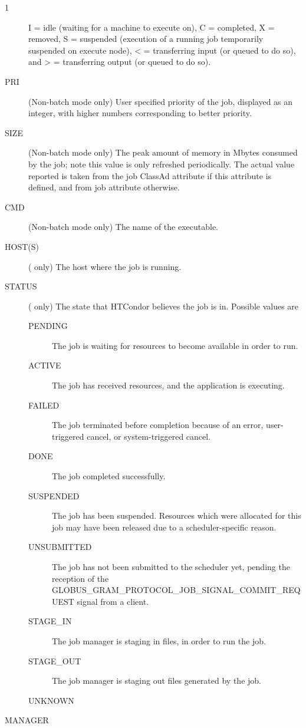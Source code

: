 \begin{ManPage}{\label{man-condor-q}}{1}
\begin{description}
	I = idle
        (waiting for a machine to execute on), C = completed, 
        X = removed,
		S = suspended (execution of a running job temporarily suspended on execute node),
        < = transferring input (or queued to do so), and
        > = transferring output (or queued to do so). 
\item[PRI] (Non-batch mode only) User specified priority of the job,
	displayed as an integer, with higher numbers corresponding to better
	priority. 
\item[SIZE] (Non-batch mode only) The peak amount of memory in Mbytes
	consumed by the job; note this value is only refreshed periodically.
	The actual value reported is taken from the job ClassAd attribute
	 if this attribute is defined, and from job
	attribute  otherwise.
\item[CMD] (Non-batch mode only) The name of the executable. 
\item[HOST(S)] ( only) The host where the job is running.
\item[STATUS] ( only) The state that HTCondor believes the job is in.
Possible values are
  \begin{description}
    \item[PENDING] The job is waiting for resources to become available
    in order to run.
    \item[ACTIVE] The job has received resources, and the application
    is executing.
    \item[FAILED] The job terminated before completion because of an error,
    user-triggered cancel, or system-triggered cancel.
    \item[DONE] The job completed successfully.
    \item[SUSPENDED] The job has been suspended.
    Resources which were allocated for this job may have been
    released due to a scheduler-specific reason.
    \item[UNSUBMITTED] The job has not been submitted to the scheduler yet,
    pending the reception of the 
    GLOBUS\_GRAM\_PROTOCOL\_JOB\_SIGNAL\_COMMIT\_REQUEST signal from a client.
    \item[STAGE\_IN] The job manager is staging in files,
    in order to run the job.
    \item[STAGE\_OUT] The job manager is staging out files
    generated by the job.
    \item[UNKNOWN]
  \end{description}
\item[MANAGER] 

\end{description}
\end{ManPage}

